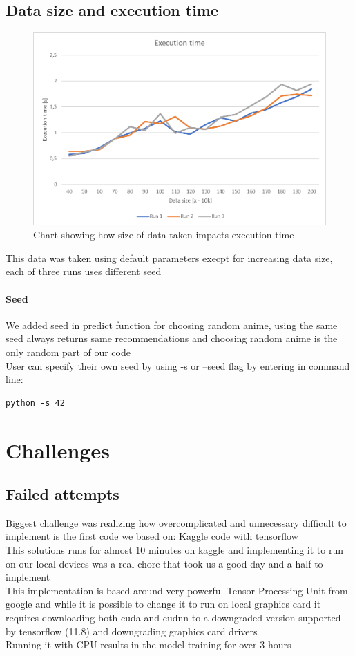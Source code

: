 \documentclass[12pt]{article}
\begin{document}
  \subsection{Data size and execution time}
  \begin{figure}
    \caption{Chart showing how size of data taken impacts execution time }
    \includegraphics[width=\textwidth]{execution_time.png}
  \end{figure}
This data was taken using default parameters execpt for increasing data size, each of three runs uses different seed


\paragraph{Seed} We added seed in predict function for choosing random anime, using the same seed always returns same recommendations and choosing random anime is the only random part of our code \\ 
User can specify their own seed by using -s or --seed flag by entering in command line:
\begin{lstlisting}
python -s 42
\end{lstlisting}
\section{Challenges}
\subsection{Failed attempts}
Biggest challenge was realizing how overcomplicated and unnecessary difficult to implement is the first code we based on: \href{https://www.kaggle.com/code/chaitanya99/recommendation-system-cf-anime}{Kaggle code with tensorflow} \\ 
This solutions runs for almost 10 minutes on kaggle and implementing it to run on our local devices was a real chore that took us a good day and a half to implement \\
This implementation is based around very powerful Tensor Processing Unit from google and while it is possible to change it to run on local graphics card it requires downloading both cuda and cudnn to a downgraded version supported by tensorflow (11.8) and downgrading graphics card drivers \\ 
Running it with CPU results in the model training for over 3 hours 
\end{document}
